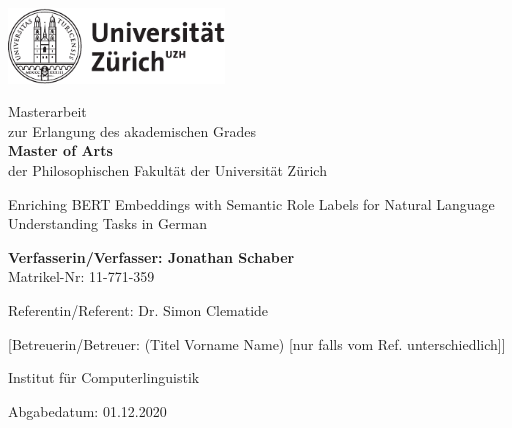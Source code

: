 \begin{titlepage}
\includegraphics[height=20mm]{images/uzh_logo_d_pos}\\

\begin{center}

{\sffamily
Masterarbeit \\
zur Erlangung des akademischen Grades \\
\textbf{Master of Arts} \\
der Philosophischen Fakultät der Universität Zürich \\

\vspace{2cm}

{\Large Enriching BERT Embeddings with Semantic Role Labels for Natural Language Understanding Tasks in German}\\

\vspace{4cm}

\textbf{Verfasserin/Verfasser: Jonathan Schaber} \\
	Matrikel-Nr: 11-771-359 \\

\vspace{2cm}

Referentin/Referent: Dr. Simon Clematide

[Betreuerin/Betreuer: (Titel Vorname Name) {\small [nur falls vom Ref. unterschiedlich]}]

Institut f\"ur Computerlinguistik

\vfill Abgabedatum: 01.12.2020

\vspace{3cm}
}
\end{center}

\end{titlepage}

\newpage
